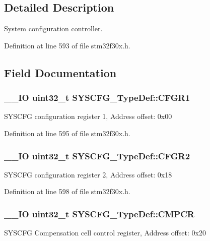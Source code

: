 \subsection{Detailed Description}
System configuration controller. 

Definition at line 593 of file stm32f30x.\-h.



\subsection{Field Documentation}
\hypertarget{struct_s_y_s_c_f_g___type_def_a5e0e229c223361eee4278d585787ace1}{
\subsubsection[{C\-F\-G\-R1}]{\setlength{\rightskip}{0pt plus 5cm}\-\_\-\-\_\-\-I\-O {\bf uint32\-\_\-t} S\-Y\-S\-C\-F\-G\-\_\-\-Type\-Def\-::\-C\-F\-G\-R1}}\label{struct_s_y_s_c_f_g___type_def_a5e0e229c223361eee4278d585787ace1}
S\-Y\-S\-C\-F\-G configuration register 1, Address offset\-: 0x00 

Definition at line 595 of file stm32f30x.\-h.

\hypertarget{struct_s_y_s_c_f_g___type_def_aa643f1162e93489204200a465e11fd86}{
\subsubsection[{C\-F\-G\-R2}]{\setlength{\rightskip}{0pt plus 5cm}\-\_\-\-\_\-\-I\-O {\bf uint32\-\_\-t} S\-Y\-S\-C\-F\-G\-\_\-\-Type\-Def\-::\-C\-F\-G\-R2}}\label{struct_s_y_s_c_f_g___type_def_aa643f1162e93489204200a465e11fd86}
S\-Y\-S\-C\-F\-G configuration register 2, Address offset\-: 0x18 

Definition at line 598 of file stm32f30x.\-h.

\hypertarget{struct_s_y_s_c_f_g___type_def_ada13497abc6402300570ff5f430a612e}{
\subsubsection[{C\-M\-P\-C\-R}]{\setlength{\rightskip}{0pt plus 5cm}\-\_\-\-\_\-\-I\-O {\bf uint32\-\_\-t} S\-Y\-S\-C\-F\-G\-\_\-\-Type\-Def\-::\-C\-M\-P\-C\-R}}\label{struct_s_y_s_c_f_g___type_def_ada13497abc6402300570ff5f430a612e}
S\-Y\-S\-C\-F\-G Compensation cell control register, Address offset\-: 0x20 

